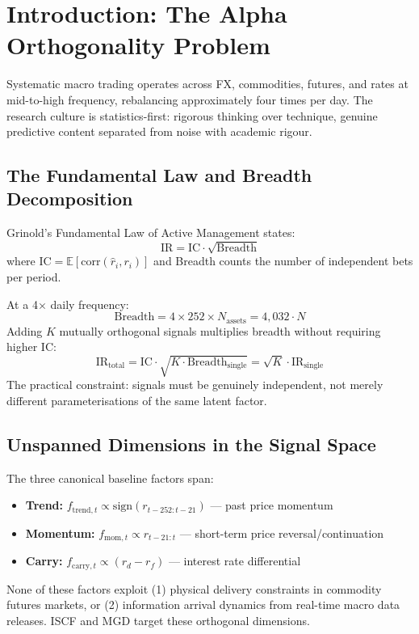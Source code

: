 \documentclass[11pt]{article}
\begin{document}
\section{Introduction: The Alpha Orthogonality Problem}

Systematic macro trading operates across FX, commodities, futures, and rates at mid-to-high frequency, rebalancing approximately four times per day. The research culture is statistics-first: rigorous thinking over technique, genuine predictive content separated from noise with academic rigour.

\subsection{The Fundamental Law and Breadth Decomposition}

Grinold's Fundamental Law of Active Management states:
\begin{equation}
\text{IR} = \text{IC} \cdot \sqrt{\text{Breadth}}
\label{eq:fundamental-law}
\end{equation}
where $\text{IC} = \mathbb{E}[\text{corr}(\hat{r}_i, r_i)]$ and Breadth counts the number of independent bets per period.

At a 4$\times$ daily frequency:
\begin{equation}
\text{Breadth} = 4 \times 252 \times N_{\text{assets}} = 4{,}032 \cdot N
\label{eq:breadth}
\end{equation}
Adding $K$ mutually orthogonal signals multiplies breadth without requiring higher IC:
\begin{equation}
\text{IR}_{\text{total}} = \text{IC} \cdot \sqrt{K \cdot \text{Breadth}_{\text{single}}} = \sqrt{K} \cdot \text{IR}_{\text{single}}
\label{eq:ir-total}
\end{equation}
The practical constraint: signals must be genuinely independent, not merely different parameterisations of the same latent factor.

\subsection{Unspanned Dimensions in the Signal Space}

The three canonical baseline factors span:
\begin{itemize}
\item \textbf{Trend:} $f_{\text{trend},t} \propto \text{sign}(r_{t-252:t-21})$ --- past price momentum
\item \textbf{Momentum:} $f_{\text{mom},t} \propto r_{t-21:t}$ --- short-term price reversal/continuation
\item \textbf{Carry:} $f_{\text{carry},t} \propto (r_d - r_f)$ --- interest rate differential
\end{itemize}
None of these factors exploit (1) physical delivery constraints in commodity futures markets, or (2) information arrival dynamics from real-time macro data releases. ISCF and MGD target these orthogonal dimensions.
\end{document}
